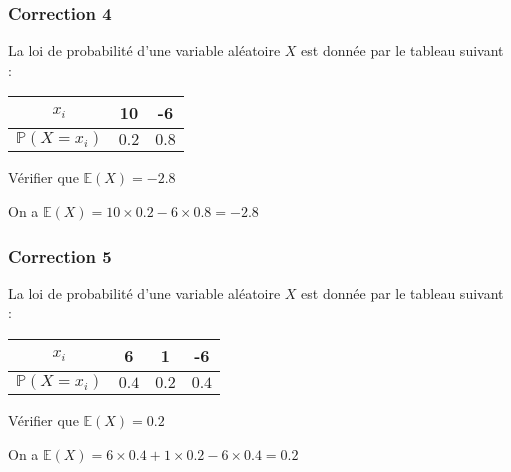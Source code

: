 \documentclass[15pt, mathserif]{beamer}
\newcommand{\Prem}{\mathbb{P}}	%
\begin{document}
\begin{frame}
\vspace{-10mm}
	\frametitle{Correction 4}
La loi de probabilité d'une variable aléatoire $X$ est donnée par le tableau suivant : 
 \begin{center} 
 \begin{tabular}{|c|c|c|} 
 \hline 
 $x_i$ & 10 & -6 \\ 
 \hline $\Prem(X=x_i)$ & $0.2$ & $0.8$ \\ 
 \hline 
 \end{tabular} 
 \end{center} 
 Vérifier que $\mathbb{E}(X)=-2.8$ 
 
 On a $\mathbb{E}(X)=10\times 0.2-6 \times 0.8=-2.8$\end{frame}


\begin{frame}
\vspace{-10mm}
	\frametitle{Correction 5}
La loi de probabilité d'une variable aléatoire $X$ est donnée par le tableau suivant : 
 \begin{center} 
 \begin{tabular}{|c|c|c|c|} 
 \hline 
 $x_i$ & 6 & 1 & -6 \\ 
 \hline $\Prem(X=x_i)$ & $0.4$ & $0.2$& $0.4$ \\ 
 \hline 
 \end{tabular} 
 \end{center} 
 Vérifier que $\mathbb{E}(X)=0.2$ 
 
 On a $\mathbb{E}(X)=6\times 0.4+1 \times 0.2-6 \times 0.4=0.2$\end{frame}
\end{document}

